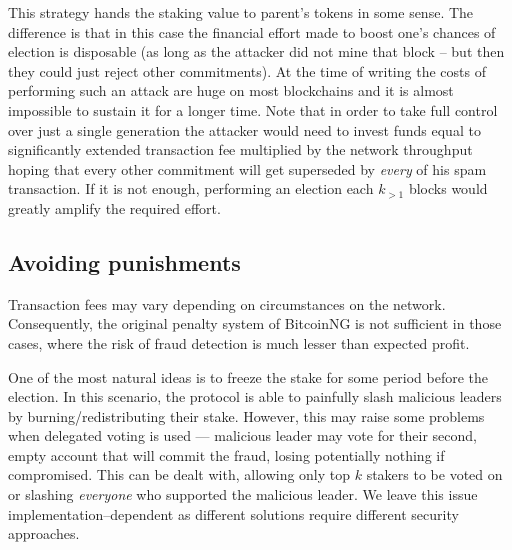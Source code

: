 This strategy hands the staking value to parent's tokens in some sense. The
difference is that in this case the financial effort made to boost one's chances
of election is disposable (as long as the attacker did not mine that block – but
then they could just reject other commitments). At the time of writing the costs
of performing such an attack are huge on most blockchains and it is
almost impossible to sustain it for a longer time. Note that in order to take
full control over just a single generation the
attacker would need to invest funds equal to significantly extended transaction
fee multiplied by the network throughput hoping that every other commitment will
get superseded by \textit{every} of his spam transaction. If it is not enough,
performing an election each $k_{> 1}$ blocks would greatly amplify the required
effort.

\subsection{Avoiding punishments}
Transaction fees may vary depending on circumstances on the network.
Consequently, the original penalty system of BitcoinNG is not sufficient in
those cases, where the risk of fraud detection is much lesser than expected profit.

One of the most natural ideas is to freeze the stake for some period before the
election. In this scenario, the protocol is able to painfully slash
malicious leaders by burning/redistributing their stake. However, this may raise
some problems when delegated voting is used — malicious leader may vote
for their second, empty account that will commit the fraud, losing potentially
nothing if compromised. This can be dealt with, allowing only
top $k$ stakers to be voted on or slashing \textit{everyone} who supported the
malicious leader. We leave this issue implementation–dependent as different solutions
require different security approaches.

